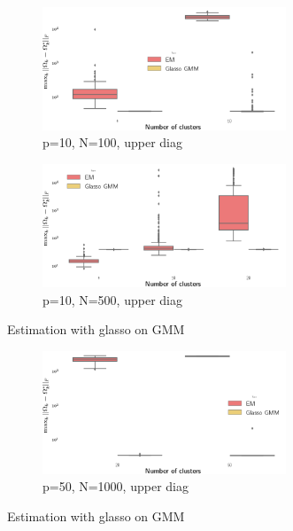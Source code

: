 \begin{figure}

        \begin{subfigure}[b]{\textwidth}
                \includegraphics[width=0.8\textwidth]{TeX_files/graph_lasso_diag_upper10_100.png} 
                \caption{p=10, N=100, upper diag}
                \label{fig:glasso_dim10_N100_ud}
        \end{subfigure}       
        \begin{subfigure}[b]{\textwidth}
                \includegraphics[width=0.8\textwidth]{TeX_files/graph_lasso_diag_upper10_500.png}
                \caption{p=10, N=500, upper diag}
                \label{fig:glasso_dim10_N500_ud}
        \end{subfigure}
        \caption{Estimation with glasso on GMM}\label{fig:glasso_res_simu2} 
\end{figure}
\begin{figure}

        \begin{subfigure}[b]{\textwidth}
                \includegraphics[width=0.8\textwidth]{TeX_files/graph_lasso_diag_upper50_1000.png} 
                \caption{p=50, N=1000, upper diag}
                \label{fig:glasso_dim50_N1000_ud}
        \end{subfigure}       
        \caption{Estimation with glasso on GMM}\label{fig:glasso_res_simu2} 
\end{figure}

